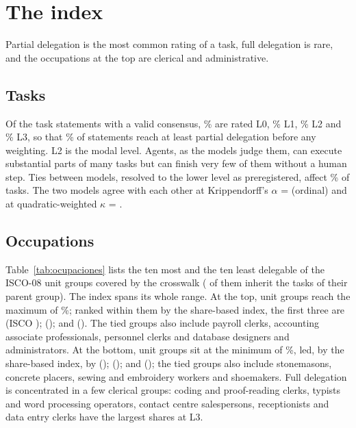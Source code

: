 \section{The index}
\label{sec:indice}

Partial delegation is the most common rating of a task, full delegation is rare, and the occupations at the top are clerical and administrative.

\subsection{Tasks}

Of the  task statements with a valid consensus, \% are rated L0, \% L1, \% L2 and \% L3, so that \% of statements reach at least partial delegation before any weighting.
L2 is the modal level.
Agents, as the models judge them, can execute substantial parts of many tasks but can finish very few of them without a human step.
Ties between models, resolved to the lower level as preregistered, affect \% of tasks.
The two models agree with each other at Krippendorff's $\alpha$ =  (ordinal) and at quadratic-weighted $\kappa$ = .

\subsection{Occupations}

Table~\ref{tab:ocupaciones} lists the ten most and the ten least delegable of the  ISCO-08 unit groups covered by the crosswalk ( of them inherit the tasks of their parent group).
The index spans its whole range.
At the top,  unit groups reach the maximum of \%; ranked within them by the share-based index, the first three are  (ISCO );  (); and  (). The tied groups also include payroll clerks, accounting associate professionals, personnel clerks and database designers and administrators.
At the bottom,  unit groups sit at the minimum of \%, led, by the share-based index, by  ();  (); and  (); the tied groups also include stonemasons, concrete placers, sewing and embroidery workers and shoemakers.
Full delegation is concentrated in a few clerical groups: coding and proof-reading clerks, typists and word processing operators, contact centre salespersons, receptionists and data entry clerks have the largest shares at L3.

